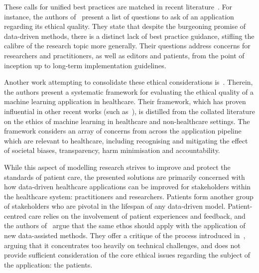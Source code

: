 These calls for unified best practices are matched in recent
literature~\cite{Liu2019,Monks2018,Vollmer2020,WitjasPaalberends2017}. For
instance, the authors of~\cite{Vollmer2020} present a list of questions to ask
of an application regarding its ethical quality. They state that despite the
burgeoning promise of data-driven methods, there is a distinct lack of best
practice guidance, stifling the calibre of the research topic more generally.
Their questions address concerns for researchers and practitioners, as well as
editors and patients, from the point of inception up to long-term implementation
guidelines.

Another work attempting to consolidate these ethical considerations
is~\cite{Char2020}. Therein, the authors present a systematic framework for
evaluating the ethical quality of a machine learning application in healthcare.
Their framework, which has proven influential in other recent works (such
as~\cite{Findley2020,Kraft2020}), is distilled from the collated literature on
the ethics of machine learning in healthcare and non-healthcare settings. The
framework considers an array of concerns from across the application pipeline
which are relevant to healthcare, including recognising and mitigating the
effect of societal biases, transparency, harm minimisation and accountability.

While this aspect of modelling research strives to improve and protect the
standards of patient care, the presented solutions are primarily concerned with
how data-driven healthcare applications can be improved for stakeholders within
the healthcare system: practitioners and researchers. Patients form another
group of stakeholders who are pivotal in the lifespan of any data-driven
model. Patient-centred care relies on the involvement of patient experiences and
feedback, and the authors of~\cite{Findley2020} argue that the same ethos should
apply with the application of new data-assisted methods. They offer a critique
of the process introduced in~\cite{Char2020}, arguing that it concentrates too
heavily on technical challenges, and does not provide sufficient consideration
of the core ethical issues regarding the subject of the application: the
patients.


